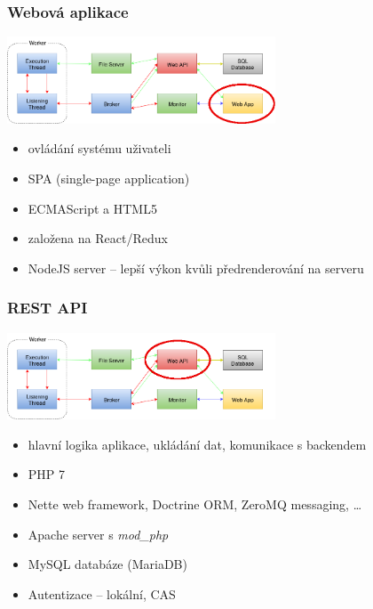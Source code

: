 \documentclass{beamer}
\begin{document}
\begin{frame}
	\frametitle{Webová aplikace}
	\begin{center}
		\includegraphics[width=0.6\textwidth]{images/communication-webapp.png}
	\end{center}
	\begin{itemize}
		\item ovládání systému uživateli
		\item SPA (single-page application)
		\item ECMAScript a HTML5
		\item založena na React/Redux
		\item NodeJS server -- lepší výkon kvůli předrenderování na serveru
	\end{itemize}
\end{frame}

\begin{frame}
	\frametitle{REST API}
	\begin{center}
		\includegraphics[width=0.6\textwidth]{images/communication-webapi.png}
	\end{center}
	\begin{itemize}
		\item hlavní logika aplikace, ukládání dat, komunikace s backendem
		\item PHP 7
		\item Nette web framework, Doctrine ORM, ZeroMQ messaging, \dots
		\item Apache server s {\it mod\_php}
		\item MySQL databáze (MariaDB)
		\item Autentizace -- lokální, CAS
	\end{itemize}
\end{frame}
\end{document}
